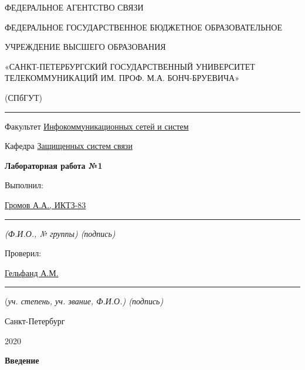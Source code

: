 \documentclass[a4paper,14pt]{extarticle}
\begin{document}
    \begin{center}
        \thispagestyle{empty}
        \begin{singlespace}
        ФЕДЕРАЛЬНОЕ АГЕНТСТВО СВЯЗИ

        ФЕДЕРАЛЬНОЕ ГОСУДАРСТВЕННОЕ БЮДЖЕТНОЕ ОБРАЗОВАТЕЛЬНОЕ

        УЧРЕЖДЕНИЕ ВЫСШЕГО ОБРАЗОВАНИЯ

        «САНКТ-ПЕТЕРБУРГСКИЙ ГОСУДАРСТВЕННЫЙ УНИВЕРСИТЕТ ТЕЛЕКОММУНИКАЦИЙ ИМ. ПРОФ. М.А. БОНЧ-БРУЕВИЧА»

        (СПбГУТ)
        \end{singlespace}
        \vspace{-1ex}
        \rule{\textwidth}{0.4pt}
        \vspace{-5ex}

        Факультет \underline{Инфокоммуникационных сетей и систем}

        Кафедра \underline{Защищенных систем связи}
        \vspace{10ex}

        \textbf{Лабораторная работа №1}

    \end{center}
    \vspace{4ex}
    \begin{flushright}
    \parbox{8cm}{
    \begin{flushleft}
        Выполнил:

        \underline{Громов А.А., ИКТЗ-83} \hfill \rule[-0.85ex]{0.1\textwidth}{0.6pt}

        \footnotesize \textit{ (Ф.И.О., № группы) \hfill (подпись)} \normalsize

        Проверил:

        \underline{Гельфанд А.М.} \hfill \rule[-0.85ex]{0.1\textwidth}{0.6pt}

        (\footnotesize \textit{уч. степень, уч. звание, Ф.И.О.) \hfill (подпись)} \normalsize

    \end{flushleft}
    }
    \end{flushright}
    \begin{center}
        \vfill
        Санкт-Петербург

        2020

        \end{center}

    \newpage
    \begin{center}
        \textbf{\large{ Введение}}
    \end{center}
\end{document}
